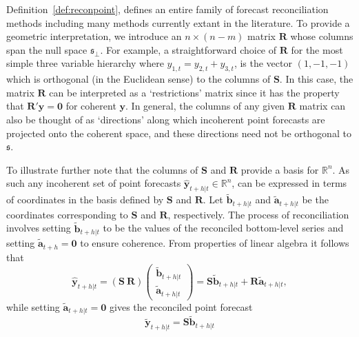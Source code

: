 \documentclass[a4paper, 11pt]{article}
\theoremstyle{theo}
\theoremstyle{definition}
\begin{document}
Definition~\ref{def:reconpoint}, defines an entire family of forecast reconciliation methods including many methods currently extant in the literature. To provide a geometric interpretation, we introduce an $n \times (n-m)$ matrix $\bm{R}$ whose columns span the null space $\mathfrak{s}_{\perp}$.  For example, a straightforward choice of $\bm{R}$ for the most simple three variable hierarchy where $y_{1,t}=y_{2,t}+y_{3,t}$, is the vector $(1,-1,-1)$ which is orthogonal (in the Euclidean sense) to the columns of $\bm{S}$.  In this case, the matrix $\bm{R}$ can be interpreted as a `restrictions' matrix since it has the property that $\bm{R}'\bm{y}=\bm{0}$ for coherent $\bm{y}$. In general, the columns of any given $\bm{R}$ matrix can also be thought of as `directions' along which incoherent point forecasts are projected onto the coherent space, and these directions need not be orthogonal to $\mathfrak{s}$. 
%


To illustrate further note that the columns of $\bm{S}$ and $\bm{R}$ provide a basis for $\mathbb{R}^n$.  As such any incoherent set of point forecasts $\hat{\bm{y}}_{t+h|t} \in \mathbb{R}^n$, can be expressed in terms of coordinates in the basis defined by $\bm{S}$ and $\bm{R}$. Let $\tilde{\bm{b}}_{t+h|t}$ and $\tilde{\bm{a}}_{t+h|t}$ be the coordinates corresponding to $\bm{S}$ and $\bm{R}$, respectively. The process of reconciliation involves setting $\tilde{\bm{b}}_{t+h|t}$ to be the values of the reconciled bottom-level series and setting $\tilde{\bm{a}}_{t+h}=\bm{0}$ to ensure coherence. From properties of linear algebra it follows that 
\[
\hat{\bm{y}}_{t+h|t} = (\bm{S} ~ \bm{R})
\begin{pmatrix}
\tilde{\bm{b}}_{t+h|t}\\ \tilde{\bm{a}}_{t+h|t}
\end{pmatrix}= \bm{S}\tilde{\bm{b}}_{t+h|t} +  \bm{R}\tilde{\bm{a}}_{t+h|t},
\]
while setting $\tilde{\bm{a}}_{t+h|t}=\bm{0}$ gives the reconciled point forecast
\[
\tilde{\bm{y}}_{t+h|t} = \bm{S}\tilde{\bm{b}}_{t+h|t}
\]
\end{document}
